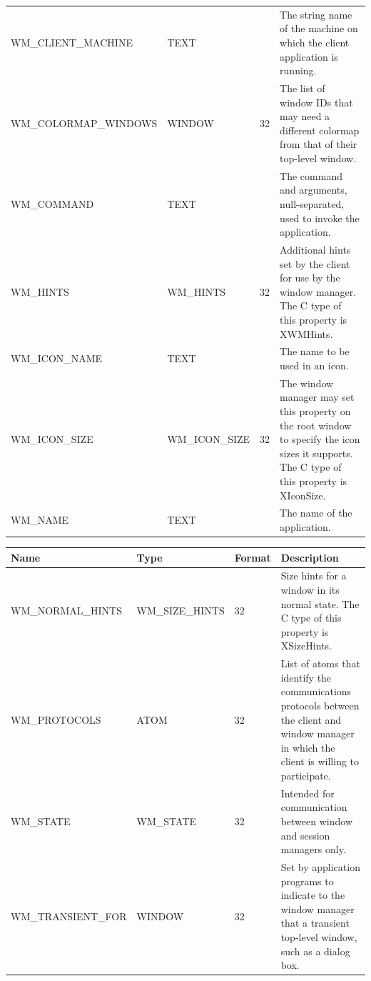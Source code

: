 \documentclass{report}
\begin{document}
\begin{itemize}
\begin{itemize}
\begin{center}
\begin{tabularx}{\textwidth}{@{}XllX@{}}
                    WM\_CLIENT\_MACHINE &TEXT& &The string name of the machine on which the client application is running.\\[2ex]
                    WM\_COLORMAP\_WINDOWS &WINDOW &32 &The list of window IDs that may need a different colormap from that of their top-level window.\\[2ex]
                    WM\_COMMAND &TEXT & &The command and arguments, null-separated, used to invoke the application.\\[2ex]
                    WM\_HINTS &WM\_HINTS &32& Additional hints set by the client for use by the window manager. The C type of this property is XWMHints.\\[2ex]
                    WM\_ICON\_NAME &TEXT& & The name to be used in an icon.\\[2ex]
                    WM\_ICON\_SIZE& WM\_ICON\_SIZE &32& The window manager may set this property on the root window to specify the icon sizes it supports. The C type of this property is XIconSize.\\[2ex]
                    WM\_NAME &TEXT& &The name of the application. \\
                    \bottomrule
                \end{tabularx}
            \end{center}
            \bigbreak \noindent 
            \begin{center}
                \begin{tabularx}{\textwidth}{@{}XllX@{}}
                    \toprule
                    \textbf{Name}& \textbf{Type}& \textbf{Format}& \textbf{Description} \\
                    \midrule
                    WM\_NORMAL\_HINTS &WM\_SIZE\_HINTS &32 &Size hints for a window in its normal state. The C type of this property is XSizeHints.\\[2ex]
                    WM\_PROTOCOLS &ATOM &32 &List of atoms that identify the communications protocols between the client and window manager in which the client is willing to participate.\\[2ex]
                    WM\_STATE& WM\_STATE &32 &Intended for communication between window and session managers only.\\[2ex]
                    WM\_TRANSIENT\_FOR &WINDOW &32 &Set by application programs to indicate to the window manager that a transient top-level window, such as a dialog box. \\
                    \bottomrule
                \end{tabularx}

\end{center}
\end{itemize}
\end{itemize}
\end{document}
